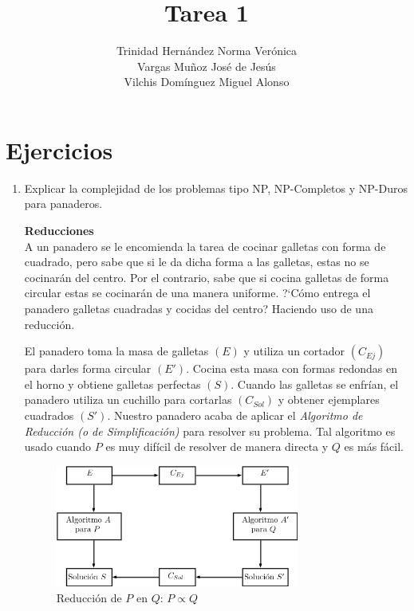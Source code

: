 \documentclass[11 pt, a4paper]{article}
\author{Trinidad Hern\'andez Norma Ver\'onica \\
        Vargas Mu\~noz Jos\'e de Jes\'us \\
        Vilchis Dom\'inguez Miguel Alonso}
\title{Tarea 1}
\theoremstyle{definition}
\begin{document}
\maketitle

\section{Ejercicios}

\begin{enumerate}

    \item Explicar la complejidad de los problemas tipo NP, NP-Completos y NP-Duros para panaderos.

            \textbf{Reducciones} \\ 
            A un panadero se le encomienda la tarea de cocinar galletas con forma de cuadrado, pero sabe que si
            le da dicha forma a las galletas, estas no se cocinar\'an del centro. Por el contrario, sabe que si cocina
            galletas de forma circular estas se cocinar\'an de una manera uniforme. ?`C\'omo entrega el panadero galletas
            cuadradas y cocidas del centro? Haciendo uso de una reducci\'on. \par

             \par

            El panadero toma la masa de galletas $(E)$ y utiliza un cortador $(C_{Ej})$ para darles forma circular
            $(E')$. Cocina esta masa con formas redondas en el horno y obtiene galletas perfectas $(S)$. Cuando las galletas se enfr\'ian, el panadero utiliza un cuchillo para cortarlas $(C_{Sol})$ y obtener ejemplares cuadrados $(S')$. Nuestro panadero acaba de aplicar el \emph{Algoritmo de Reducci\'on (o de Simplificaci\'on)} para resolver su problema. Tal algoritmo es usado cuando $P$ es muy dif\'icil de resolver de manera directa y
            $Q$ es m\'as f\'acil.

            \begin{figure}[h]
                \includegraphics[width=80mm]{Reduc_P_en_Q.png}
                \centering
                \caption{Reducci\'on de $P$ en $Q$: $P \propto Q$}
                \label{fig:PQ_Red}
            \end{figure}



\end{enumerate}
\end{document}

